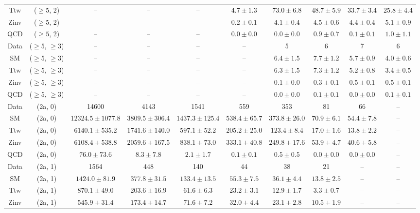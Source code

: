 \begin{table}[h!]
{\begin{tabular}{cccccccccc}
	Ttw & ($\ge5$, 2) & -- & -- & -- & $4.7\pm 1.3$ & $73.0\pm 6.8$ & $48.7\pm 5.9$ & $33.7\pm 3.4$ & $25.8\pm 4.4$ \\[0.5ex] 
	Zinv & ($\ge5$, 2) & -- & -- & -- & $0.2\pm 0.1$ & $4.1\pm 0.4$ & $4.5\pm 0.6$ & $4.4\pm 0.4$ & $5.1\pm 0.9$ \\[0.5ex] 
	QCD & ($\ge5$, 2) & -- & -- & -- & $0.0\pm 0.0$ & $0.0\pm 0.0$ & $0.9\pm 0.7$ & $0.1\pm 0.1$ & $1.0\pm 1.1$ \\[0.5ex] 
	Data & ($\ge5$, $\ge3$) & -- & -- & -- & -- & 5 & 6 & 7 & 6 \\[0.5ex] 
	SM & ($\ge5$, $\ge3$) & -- & -- & -- & -- & $6.4\pm 1.5$ & $7.7\pm 1.2$ & $5.7\pm 0.9$ & $4.0\pm 0.6$ \\[0.5ex] 
	Ttw & ($\ge5$, $\ge3$) & -- & -- & -- & -- & $6.3\pm 1.5$ & $7.3\pm 1.2$ & $5.2\pm 0.8$ & $3.4\pm 0.5$ \\[0.5ex] 
	Zinv & ($\ge5$, $\ge3$) & -- & -- & -- & -- & $0.1\pm 0.0$ & $0.3\pm 0.1$ & $0.5\pm 0.1$ & $0.5\pm 0.1$ \\[0.5ex] 
	QCD & ($\ge5$, $\ge3$) & -- & -- & -- & -- & $0.0\pm 0.0$ & $0.1\pm 0.1$ & $0.0\pm 0.0$ & $0.1\pm 0.1$ \\[0.5ex] 
	Data & (2a, 0) & 14600 & 4143 & 1541 & 559 & 353 & 81 & 66 & -- \\[0.5ex] 
	SM & (2a, 0) & $12324.5\pm 1077.8$ & $3809.5\pm 306.4$ & $1437.3\pm 125.4$ & $538.4\pm 65.7$ & $373.8\pm 26.0$ & $70.9\pm 6.1$ & $54.4\pm 7.8$ & -- \\[0.5ex] 
	Ttw & (2a, 0) & $6140.1\pm 535.2$ & $1741.6\pm 140.0$ & $597.1\pm 52.2$ & $205.2\pm 25.0$ & $123.4\pm 8.4$ & $17.0\pm 1.6$ & $13.8\pm 2.2$ & -- \\[0.5ex] 
	Zinv & (2a, 0) & $6108.4\pm 538.8$ & $2059.6\pm 167.5$ & $838.1\pm 73.0$ & $333.1\pm 40.8$ & $249.8\pm 17.6$ & $53.9\pm 4.7$ & $40.6\pm 5.8$ & -- \\[0.5ex] 
	QCD & (2a, 0) & $76.0\pm 73.6$ & $8.3\pm 7.8$ & $2.1\pm 1.7$ & $0.1\pm 0.1$ & $0.5\pm 0.5$ & $0.0\pm 0.0$ & $0.0\pm 0.0$ & -- \\[0.5ex] 
	Data & (2a, 1) & 1564 & 448 & 140 & 44 & 38 & 21 & -- & -- \\[0.5ex] 
	SM & (2a, 1) & $1424.0\pm 81.9$ & $377.8\pm 31.5$ & $133.4\pm 13.5$ & $55.3\pm 7.5$ & $36.1\pm 4.4$ & $13.8\pm 2.5$ & -- & -- \\[0.5ex] 
	Ttw & (2a, 1) & $870.1\pm 49.0$ & $203.6\pm 16.9$ & $61.6\pm 6.3$ & $23.2\pm 3.1$ & $12.9\pm 1.7$ & $3.3\pm 0.7$ & -- & -- \\[0.5ex] 
	Zinv & (2a, 1) & $545.9\pm 31.4$ & $173.4\pm 14.7$ & $71.6\pm 7.2$ & $32.0\pm 4.4$ & $23.1\pm 2.8$ & $10.5\pm 1.9$ & -- & -- \\[0.5ex] 

\end{tabular}}
\end{table}
